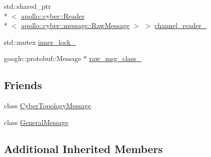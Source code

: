 \begin{DoxyCompactItemize}
\item 
std\-::shared\-\_\-ptr\\*
$<$ \hyperlink{classapollo_1_1cyber_1_1Reader}{apollo\-::cyber\-::\-Reader}\\*
$<$ \hyperlink{structapollo_1_1cyber_1_1message_1_1RawMessage}{apollo\-::cyber\-::message\-::\-Raw\-Message} $>$ $>$ \hyperlink{classGeneralChannelMessage_a6fbe63b8ee339b6bbf99736aa6a873cf}{channel\-\_\-reader\-\_\-}
\item 
std\-::mutex \hyperlink{classGeneralChannelMessage_a58d9c04f21d27bcbcce36073f4325c7e}{inner\-\_\-lock\-\_\-}
\item 
google\-::protobuf\-::\-Message $\ast$ \hyperlink{classGeneralChannelMessage_ab150e16ccbb7e536a0b6e6276e3eca7a}{raw\-\_\-msg\-\_\-class\-\_\-}
\end{DoxyCompactItemize}
\subsection*{Friends}
\begin{DoxyCompactItemize}
\item 
class \hyperlink{classGeneralChannelMessage_ae90c7f27bec878186a229b7b314512f6}{Cyber\-Topology\-Message}
\item 
class \hyperlink{classGeneralChannelMessage_abcf2c2516937d8e5700b72b878385bb2}{General\-Message}
\end{DoxyCompactItemize}
\subsection*{Additional Inherited Members}


